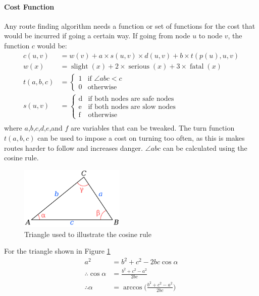 \documentclass[11pt,twoside,a4paper]{report}
\begin{document}
\paragraph{Cost Function}
Any route finding algorithm needs a function or set of functions for the cost that would be incurred if going a certain way. If going from node $u$ to node $v$, the function $c$ would be:
\begin{align*}
    c(u,v) &= w(v) + a\times s(u,v)\times d(u,v) + b\times t(p(u),u,v)\\
    w(x) &= \operatorname{slight}(x) + 2 \times\operatorname{serious}(x) + 3\times\operatorname{fatal}(x)\\
    t(a,b,c) &=\begin{cases} \mbox{1} & \mbox{if } \angle abc < c \\ \mbox{0} & \mbox{otherwise} \end{cases}\\
    s(u,v) &=\begin{cases} \mbox{d} & \mbox{if } \text{both nodes are safe nodes} \\ \mbox{e} & \mbox{if both nodes are slow nodes}\\ \mbox{f} & \mbox{otherwise} \end{cases}\\
\end{align*}
where $a$,$b$,$c$,$d$,$e$,and $f$ are variables that can be tweaked. The turn function $t(a,b,c)$ can be used to impose a cost on turning too often, as this is makes routes harder to follow and increases danger. $\angle abc$ can be calculated 
using the cosine rule.
\begin{figure}[t]
    \begin{center}
    \includegraphics[width=5cm]{cosinediagram.png}
    \caption{Triangle used to illustrate the cosine rule \cite{cosinerulediagram}}
    \label{cosinediag}
    \end{center}
\end{figure}
For the triangle shown in Figure \ref{cosinediag}
\begin{align*}
a^2 &= b^2 + c^2 - 2bc\cos{\alpha}\\
\therefore \cos{\alpha} &= \frac{b^2+c^2-a^2}{2bc}\\
\therefore \alpha &= \arccos{(\frac{b^2+c^2-a^2}{2bc}})
\end{align*}
\end{document}
